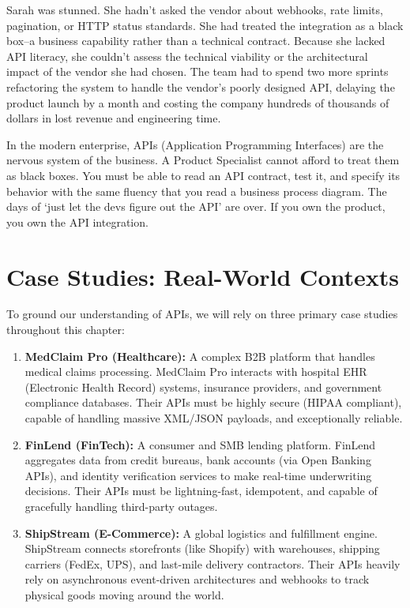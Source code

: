 \documentclass[
  11pt,
  openany,
  oneside]{book}
\providecommand{\tightlist}{%
  \setlength{\itemsep}{0pt}\setlength{\parskip}{0pt}}
\begin{document}
Sarah was stunned. She hadn't asked the vendor about webhooks, rate
limits, pagination, or HTTP status standards. She had treated the
integration as a black box--a business capability rather than a
technical contract. Because she lacked API literacy, she couldn't assess
the technical viability or the architectural impact of the vendor she
had chosen. The team had to spend two more sprints refactoring the
system to handle the vendor's poorly designed API, delaying the product
launch by a month and costing the company hundreds of thousands of
dollars in lost revenue and engineering time.

In the modern enterprise, APIs (Application Programming Interfaces) are
the nervous system of the business. A Product Specialist cannot afford
to treat them as black boxes. You must be able to read an API contract,
test it, and specify its behavior with the same fluency that you read a
business process diagram. The days of `just let the devs figure out the
API' are over. If you own the product, you own the API integration.

\section{Case Studies: Real-World
Contexts}\label{case-studies-real-world-contexts}

To ground our understanding of APIs, we will rely on three primary case
studies throughout this chapter:

\begin{enumerate}
\def\labelenumi{\arabic{enumi}.}
\tightlist
\item
  \textbf{MedClaim Pro (Healthcare):} A complex B2B platform that
  handles medical claims processing. MedClaim Pro interacts with
  hospital EHR (Electronic Health Record) systems, insurance providers,
  and government compliance databases. Their APIs must be highly secure
  (HIPAA compliant), capable of handling massive XML/JSON payloads, and
  exceptionally reliable.
\item
  \textbf{FinLend (FinTech):} A consumer and SMB lending platform.
  FinLend aggregates data from credit bureaus, bank accounts (via Open
  Banking APIs), and identity verification services to make real-time
  underwriting decisions. Their APIs must be lightning-fast, idempotent,
  and capable of gracefully handling third-party outages.
\item
  \textbf{ShipStream (E-Commerce):} A global logistics and fulfillment
  engine. ShipStream connects storefronts (like Shopify) with
  warehouses, shipping carriers (FedEx, UPS), and last-mile delivery
  contractors. Their APIs heavily rely on asynchronous event-driven
  architectures and webhooks to track physical goods moving around the
  world.
\end{enumerate}
\end{document}
